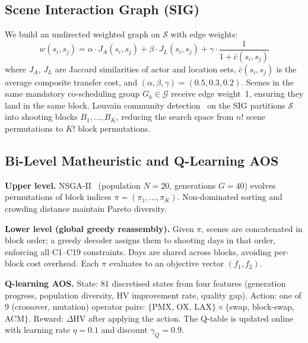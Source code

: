 \subsection{Scene Interaction Graph (SIG)}
\label{sec:sig}

We build an undirected weighted graph on $\mathcal{S}$ with edge weights:
\begin{equation}
  w(s_i, s_j) = \alpha \cdot J_A(s_i, s_j)
              + \beta  \cdot J_L(s_i, s_j)
              + \gamma \cdot \frac{1}{1 + \bar{c}(s_i, s_j)}
  \label{eq:sig}
\end{equation}
where $J_A$, $J_L$ are Jaccard similarities of actor and location sets, $\bar{c}(s_i,s_j)$ is the average composite transfer cost, and $(\alpha,\beta,\gamma)=(0.5,0.3,0.2)$.
Scenes in the same mandatory co-scheduling group $G_k \in \mathcal{G}$ receive edge weight~1, ensuring they land in the same block.
Louvain community detection~\citep{blondel2008} on the SIG partitions $\mathcal{S}$ into shooting blocks $B_1,\ldots,B_K$, reducing the search space from $n!$ scene permutations to $K!$ block permutations.

\subsection{Bi-Level Matheuristic and Q-Learning AOS}
\label{sec:bilevel}

\textbf{Upper level.}
NSGA-II~\citep{deb2002} (population $N{=}20$, generations $G{=}40$) evolves permutations of block indices $\pi = (\pi_1, \ldots, \pi_K)$.
Non-dominated sorting and crowding distance maintain Pareto diversity.

\textbf{Lower level (global greedy reassembly).}
Given $\pi$, scenes are concatenated in block order; a greedy decoder assigns them to shooting days in that order, enforcing all C1--C19 constraints.
Days are shared across blocks, avoiding per-block cost overhead.
Each $\pi$ evaluates to an objective vector $(f_1, f_2)$.

\textbf{Q-learning AOS.}
State: 81 discretised states from four features (generation progress, population diversity, HV improvement rate, quality gap).
Action: one of 9 (crossover, mutation) operator pairs: $\{$PMX, OX, LAX$\} \times \{$swap, block-swap, ACM$\}$.
Reward: $\Delta\mathrm{HV}$ after applying the action.
The Q-table is updated online with learning rate $\eta{=}0.1$ and discount $\gamma_Q{=}0.9$.

